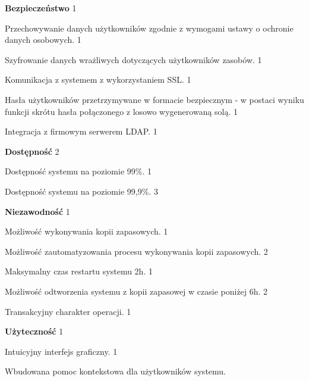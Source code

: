 \begin{myEnumerate}
	\item \textbf{Bezpieczeństwo}
          \hfill 1
	\begin{myEnumerate}
		\item Przechowywanie danych użytkowników zgodnie z wymogami ustawy o ochronie danych osobowych.
                  \hfill 1
		\item Szyfrowanie danych wrażliwych dotyczących użytkowników zasobów.
                  \hfill 1
		\item Komunikacja z systemem z wykorzystaniem SSL.
                  \hfill 1
		\item Hasła użytkowników przetrzymywane w formacie bezpiecznym - w postaci wyniku funkcji skrótu hasła połączonego z losowo wygenerowaną solą.
                  \hfill 1
		\item Integracja z firmowym serwerem LDAP.
                  \hfill 1
	\end{myEnumerate}
	\item \textbf{Dostępność}
          \hfill 2
	\begin{myEnumerate}
		\item Dostępność systemu na poziomie 99\%.
                  \hfill 1
                \item Dostępność systemu na poziomie 99,9\%.
                  \hfill 3
	\end{myEnumerate}
	\item \textbf{Niezawodność}
          \hfill 1
	\begin{myEnumerate}
		\item Możliwość wykonywania kopii zapasowych.
                  \hfill 1
		\item Możliwość zautomatyzowania procesu wykonywania kopii zapasowych.
                  \hfill 2
		\item Maksymalny czas restartu systemu 2h.
                  \hfill 1
		\item Możliwość odtworzenia systemu z kopii zapasowej w czasie poniżej 6h.
                  \hfill 2
		\item Transakcyjny charakter operacji.
                  \hfill 1
	\end{myEnumerate}
	\item \textbf{Użyteczność}
          \hfill 1
	\begin{myEnumerate}
		\item Intuicyjny interfejs graficzny.
                  \hfill 1
		\item Wbudowana pomoc kontekstowa dla użytkowników systemu.

\end{myEnumerate}
\end{myEnumerate}

